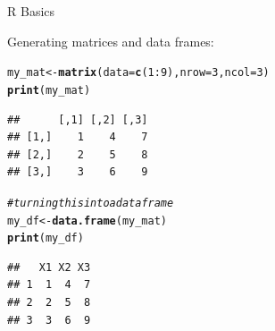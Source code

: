 \documentclass[svgnames,smaller]{beamer}\usepackage[]{graphicx}\usepackage[]{color}
\makeatletter
\newcommand{\hlnum}[1]{\textcolor[rgb]{0.686,0.059,0.569}{#1}}%
\newcommand{\hlcom}[1]{\textcolor[rgb]{0.678,0.584,0.686}{\textit{#1}}}%
\newcommand{\hlopt}[1]{\textcolor[rgb]{0,0,0}{#1}}%
\newcommand{\hlstd}[1]{\textcolor[rgb]{0.345,0.345,0.345}{#1}}%
\newcommand{\hlkwb}[1]{\textcolor[rgb]{0.69,0.353,0.396}{#1}}%
\newcommand{\hlkwc}[1]{\textcolor[rgb]{0.333,0.667,0.333}{#1}}%
\newcommand{\hlkwd}[1]{\textcolor[rgb]{0.737,0.353,0.396}{\textbf{#1}}}%
\newenvironment{kframe}{%
 \def\at@end@of@kframe{}%
 \ifinner\ifhmode%
  \def\at@end@of@kframe{\end{minipage}}%
  \begin{minipage}{\columnwidth}%
 \fi\fi%
 \def\FrameCommand##1{\hskip\@totalleftmargin \hskip-\fboxsep
 \colorbox{shadecolor}{##1}\hskip-\fboxsep
     \hskip-\linewidth \hskip-\@totalleftmargin \hskip\columnwidth}%
 \MakeFramed {\advance\hsize-\width
   \@totalleftmargin\z@ \linewidth\hsize
   \@setminipage}}%
 {\par\unskip\endMakeFramed%
 \at@end@of@kframe}
\newenvironment{knitrout}{}{} %
\makeatother
\begin{document}

\begin{frame}[fragile]{R Basics}

Generating matrices and data frames:

\begin{knitrout}\scriptsize
{}\color{fgcolor}\begin{kframe}
\begin{alltt}
\hlstd{my_mat} \hlkwb{<-} \hlkwd{matrix}\hlstd{(}\hlkwc{data} \hlstd{=} \hlkwd{c}\hlstd{(}\hlnum{1}\hlopt{:}\hlnum{9}\hlstd{),} \hlkwc{nrow} \hlstd{=} \hlnum{3}\hlstd{,} \hlkwc{ncol} \hlstd{=} \hlnum{3}\hlstd{)}
\hlkwd{print}\hlstd{(my_mat)}
\end{alltt}
\begin{verbatim}
##      [,1] [,2] [,3]
## [1,]    1    4    7
## [2,]    2    5    8
## [3,]    3    6    9
\end{verbatim}
\begin{alltt}
\hlcom{# turning this into a data frame}
\hlstd{my_df} \hlkwb{<-} \hlkwd{data.frame}\hlstd{(my_mat)}
\hlkwd{print}\hlstd{(my_df)}
\end{alltt}
\begin{verbatim}
##   X1 X2 X3
## 1  1  4  7
## 2  2  5  8
## 3  3  6  9
\end{verbatim}
\end{kframe}
\end{knitrout}

\end{frame}


\end{document}
